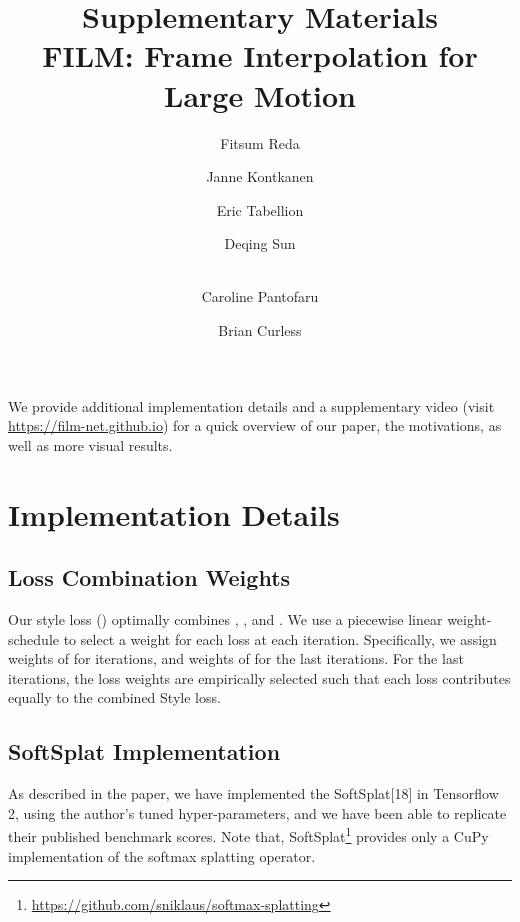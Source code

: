 \documentclass[runningheads]{llncs}
\begin{document}
\appendix
\title{ {\sc Supplementary Materials }\\FILM: Frame Interpolation for Large Motion}  

\author{Fitsum Reda \and
Janne Kontkanen \and
Eric Tabellion \and
Deqing Sun \and \\
Caroline Pantofaru \and
Brian Curless}

\maketitle

We provide additional implementation details and a supplementary video (visit \url{https://film-net.github.io}) for a quick overview of our paper, the motivations, as well as more visual results. 

\section{Implementation Details}
\subsection{Loss Combination Weights}
Our style loss () optimally combines , , and . We use a piecewise linear weight-schedule to select a weight for each loss at each iteration. Specifically, we assign weights of  for  iterations, and weights of  for the last  iterations. For the last  iterations, the loss weights are empirically selected such that each loss contributes equally to the combined Style loss.

\subsection{SoftSplat Implementation}
As described in the paper, we have implemented the SoftSplat[18] in Tensorflow 2, using the author's tuned hyper-parameters, and we have been able to replicate their published benchmark scores. Note that, SoftSplat\footnote{\url{https://github.com/sniklaus/softmax-splatting}} provides only a CuPy implementation of the softmax splatting operator.
\end{document}
